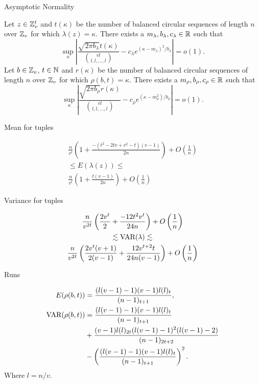 \begin{frame}{Asymptotic Normality}

  \begin{theorem}
Let $z \in \mathbb{Z}_v^t$ and $t(\kappa)$ be the number of balanced circular sequences 
of length $n$ over $\mathbb{Z}_v$ for which $\lambda(z) = \kappa$. 
There exists a $m_{\lambda},b_{\lambda},c_{\lambda} \in \mathbb{R}$ such that
  \[
    \sup_{\kappa} \left |\frac{\sqrt{2\pi b_{\lambda}}t(\kappa)}{\binom{vl}{l,l,\ldots,l}}-c_{\lambda} e^{(\kappa-m_{\lambda})^2/b_{\lambda}} \right| = o(1). 
  \]
Let $b \in \mathbb{Z}_v$, $t \in \mathbb{N}$ and $r(\kappa)$ be the number of balanced circular 
sequences of length $n$ over $\mathbb{Z}_v$ for which $\rho(b,t) = \kappa$. 
There exists a $m_{\rho},b_{\rho},c_{\rho} \in \mathbb{R}$ such that
  \[
    \sup_{\kappa} \left |\frac{\sqrt{2\pi b_{\rho}}r(\kappa)}{\binom{vl}{l,l,\ldots,l}}-c_{\rho} e^{(\kappa-m_{\rho}^2)/b_{\rho}} \right | = o(1). 
  \]
\end{theorem}
  
\end{frame}
 	
\begin{frame}{Mean for tuples}
 
\begin{multline*}
  \frac{n}{v^t}\left( 1 + \frac{- (t^2 - 2tv + v^2 - t)(v - 1)}{2n} \right ) +O\left(\frac{1}{n}\right) \\
  \leq  E(\lambda(z)) \leq  \\
  \frac{n}{v^t} \left(1 + \frac{t(v-1)}{2n}\right) +  O\left(\frac{1}{n}\right)
\end{multline*}

  \end{frame}
 	
\begin{frame}{Variance for tuples}
 
  \begin{multline*}
    \frac{n}{v^{2t}} \left( \frac{2v^t}{2} + \frac{-12t^2v^t}{24n} \right) + O\left(\frac{1}{n}\right)\\
    \lesssim    \mbox {VAR}(\lambda) \lesssim \\
    \frac{n}{v^{2t}} \left( \frac{2v^t(v+1)}{2(v-1)} + \frac{12v^{t+2}t}{24n(v-1)} \right) + O\left(\frac{1}{n}\right)
\end{multline*}
  \end{frame}


 	
\begin{frame}{Runs}

\begin{align*}
     E(\rho(b,t)) &= \frac{(l(v-1)-1)(v-1)l(l)_t}{(n-1)_{t+1}}, \\   
  \mbox {VAR}(\rho(b,t)) &= \frac{(l(v-1)-1)(v-1)l(l)_t}{(n-1)_{t+1}} \\
    & + \frac{(v-1)l(l)_{2t}(l(v-1)-1)^2(l(v-1)-2)}{(n-1)_{2t+2}} \\
    & - \left(\frac{(l(v-1)-1)(v-1)l(l)_t}{(n-1)_{t+1}}\right)^2 .
\end{align*}
Where $l = n/v$.
\end{frame}  


